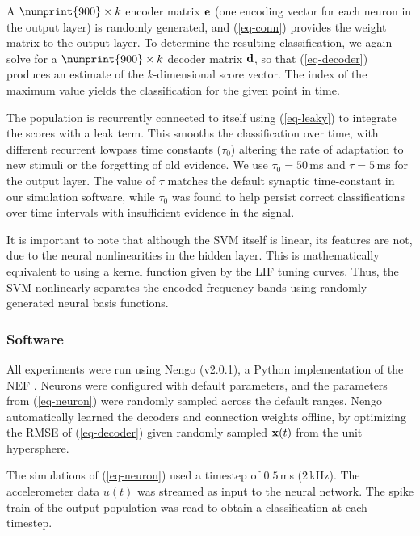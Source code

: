 A $\numprint{\outputNeurons{}} \times k$ encoder matrix $\mathbf{e}$ (one encoding vector for each neuron in the output layer)  is randomly generated, and (\ref{eq-conn}) provides the weight matrix to the output layer. To determine the resulting classification, we again solve for a $\numprint{\outputNeurons{}} \times k$ decoder matrix $\mathbf{d}$, so that (\ref{eq-decoder}) produces an estimate of the $k$-dimensional score vector. The index of the maximum value yields the classification for the given point in time. 

The population is recurrently connected to itself using (\ref{eq-leaky}) to integrate the scores with a leak term. This smooths the classification over time, with different recurrent lowpass time constants ($\tau_0$) altering the rate of adaptation to new stimuli or the forgetting of old evidence. We use $\tau_0 = 50$\,ms  and \mbox{$\tau = 5$\,ms} for the output layer. The value of $\tau$ matches the default synaptic time-constant in our simulation software, while $\tau_0$ was found to help persist correct classifications over time intervals with insufficient evidence in the signal. 

It is important to note that although the SVM itself is linear, its features are not, due to the neural nonlinearities in the hidden layer. This is mathematically equivalent to using a kernel function given by the LIF tuning curves. %
Thus, the SVM nonlinearly separates the encoded frequency bands using randomly generated neural basis functions.

\subsubsection{Software}

All experiments were run using Nengo (v2.0.1), a Python implementation of the NEF \cite{bekolay2013nengo}. Neurons were configured with default parameters, and the parameters from (\ref{eq-neuron}) were randomly sampled across the default ranges. Nengo automatically learned the decoders and connection weights offline, by optimizing the RMSE of (\ref{eq-decoder}) given randomly sampled $\mathbf{x}(t)$ from the unit hypersphere.

The simulations of (\ref{eq-neuron}) used a timestep of $0.5$\,ms ($2$\,kHz). %
The accelerometer data $u(t)$ was streamed as input to the neural network. The spike train of the output population was read to obtain a classification at each timestep. %

